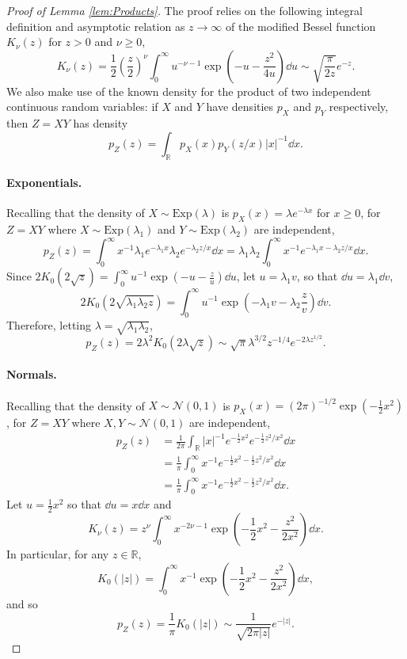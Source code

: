 \documentclass[thesis.tex]{subfiles}
\begin{document}
\begin{proof}[Proof of Lemma \ref{lem:Products}]
The proof relies on the following integral definition \cite[pg. 183]{watson1995treatise} and asymptotic relation as $z \to \infty$ \cite[pg. 202]{watson1995treatise} of the modified Bessel function $K_\nu(z)$ for $z > 0$ and $\nu \geq 0$,
\begin{equation}
\label{eq:BesselInt}
K_\nu(z) = \frac12 \left(\frac{z}{2}\right)^\nu \int_0^\infty u^{-\nu-1}\exp\left(-u - \frac{z^2}{4u}\right) \dd u \sim \sqrt{\frac{\pi}{2z}}e^{-z}. 
\end{equation}
We also make use of the known density for the product of two independent continuous random variables: if $X$ and $Y$ have densities $p_X$ and $p_Y$ respectively, then $Z = XY$ has density
\[
p_Z(z) = \int_\mathbb{R} p_X(x) p_Y(z/x) |x|^{-1} \dd x.
\]
\paragraph{Exponentials.} Recalling that the density of $X \sim \mathrm{Exp}(\lambda)$ is $p_X(x) = \lambda e^{-\lambda x}$ for $x \geq 0$, for $Z = XY$ where $X \sim \mathrm{Exp}(\lambda_1)$ and $Y \sim \mathrm{Exp}(\lambda_2)$ are independent,
\[
p_Z(z) = \int_{0}^{\infty}x^{-1}\lambda_{1}e^{-\lambda_{1}x}\lambda_{2}e^{-\lambda_{2}z/x}\dd x = \lambda_{1}\lambda_{2}\int_{0}^{\infty}x^{-1}e^{-\lambda_{1}x-\lambda_{2}z/x}\dd x.
\]
Since $2K_{0}(2\sqrt{z})=\int_{0}^{\infty}u^{-1}\exp(-u-\frac{z}{u})\dd u$, let $u = \lambda_1 v$, so that $\dd u = \lambda_1 \dd v$,
\[
2K_{0}(2\sqrt{\lambda_{1}\lambda_{2}z})=\int_{0}^{\infty}u^{-1}\exp\left(-\lambda_{1}v-\lambda_{2}\frac{z}{v}\right)\dd v.
\]
Therefore, letting $\lambda = \sqrt{\lambda_1\lambda_2}$, 
\[
p_Z(z) = 2\lambda^2 K_0(2\lambda\sqrt{z}) \sim \sqrt{\pi} \lambda^{3/2} z^{-1/4} e^{-2\lambda z^{1/2}}.
\]
\paragraph{Normals.} Recalling that the density of $X \sim \mathcal{N}(0,1)$ is $p_X(x) = (2\pi)^{-1/2} \exp(-\frac12 x^2)$, for $Z = XY$ where $X,Y \sim \mathcal{N}(0,1)$ are independent, 
\begin{align*}
p_Z(z) &= \frac{1}{2\pi}\int_{\mathbb{R}}\left|x\right|^{-1}e^{-\frac{1}{2}x^{2}}e^{-\frac{1}{2}z^{2}/x^{2}}\dd x\\
&=\frac{1}{\pi}\int_{0}^{\infty}x^{-1}e^{-\frac{1}{2}x^{2}-\frac{1}{2}z^{2}/x^{2}}\dd x\\
&=\frac{1}{\pi}\int_{0}^{\infty}x^{-1}e^{-\frac{1}{2}x^{2}-\frac{1}{2}z^{2}/x^{2}}\dd x.
\end{align*}
Let $u=\frac{1}{2}x^{2}$ so that $\dd u=x \dd x$ and
\[
K_{\nu}(z)=z^{\nu}\int_{0}^{\infty}x^{-2\nu-1}\exp\left(-\frac{1}{2}x^{2}-\frac{z^{2}}{2x^{2}}\right)\dd x.
\]
In particular, for any $z \in \mathbb{R}$,
\begin{equation}
\label{eq:BesselGauss}
K_{0}(|z|)=\int_{0}^{\infty}x^{-1}\exp\left(-\frac{1}{2}x^{2}-\frac{z^{2}}{2x^{2}}\right)\dd x,
\end{equation}
and so
\[
p_Z(z) = \frac{1}{\pi} K_0(|z|) \sim \frac{1}{\sqrt{2\pi|z|}} e^{-|z|}.
\]

\end{proof}
\end{document}
